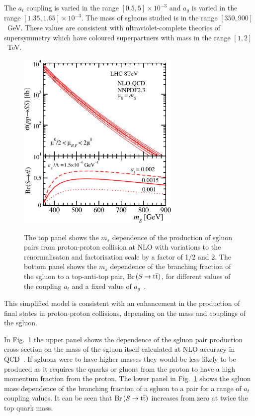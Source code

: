 The $a_t$ coupling is varied in the range $[0.5,5]\times 10^{-3}$ and $a_g$ is varied in the range $[1.35, 1.65] \times 10^{-3}$. The mass of sgluons studied is in the range $[350,900]$~GeV. These values are consistent with ultraviolet-complete theories of supersymmetry which have coloured superpartners with mass in the range $[1,2]$~TeV.
\begin{figure}[h!]
\centering
    \includegraphics[width=0.7\textwidth]{images/Pheno/xsec.pdf}\\
    \caption{The top panel shows the $m_s$ dependence of the production of sgluon pairs from proton-proton collision at NLO with variations to the renormalisaton and factorisation scale by a factor of 1/2 and 2. The bottom panel shows the $m_s$ dependence of the branching fraction of the sgluon to a top-anti-top pair, Br$(S\rightarrow\mathrm{t}\overline{\mathrm{t}})$, for different values of the coupling $a_t$ and a fixed value of $a_g$~\cite{Beck201548}.}
    \label{fig:sgluonxsec}
\end{figure}

This simplified model is consistent with an enhancement in the production of \tttt final states in proton-proton collisions, depending on the mass and couplings of the sgluon.

In Fig.~\ref{fig:sgluonxsec} the upper panel shows the dependence of the sgluon pair production cross section on the mass of the sgluon itself calculated at NLO accuracy in QCD~\cite{GoncalvesNetto:2012nt,Degrande:2014sta}. If sgluons were to have higher masses they would be less likely to be produced as it requires the quarks or gluons from the proton to have a high momentum fraction from the proton. The lower panel in Fig.~\ref{fig:sgluonxsec} shows the sgluon mass dependence of the branching fraction of a sgluon to a \ttbar pair for a range of $a_t$ coupling values. It can be seen that Br$(S\rightarrow\mathrm{t}\overline{\mathrm{t}})$ increases from zero at twice the top quark mass.


